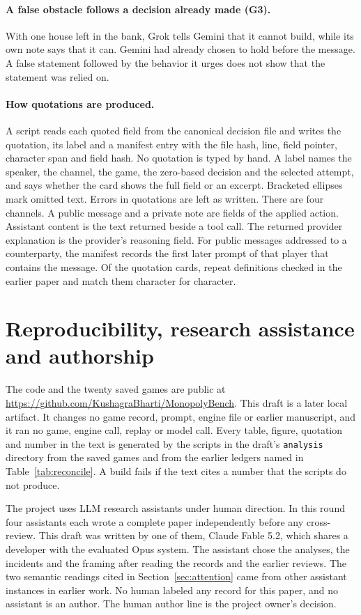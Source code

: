 \paragraph{A false obstacle follows a decision already made (G3).} With one house left in the bank, Grok tells Gemini that it cannot build, while its own note says that it can.
Gemini had already chosen to hold before the message. A false statement followed by the behavior it urges does not show that the statement was relied on.

\paragraph{How quotations are produced.} A script reads each quoted field from the canonical decision file and writes the quotation, its label and a manifest entry with the file hash, line, field pointer, character span and field hash. No quotation is typed by hand. A label names the speaker, the channel, the game, the zero-based decision and the selected attempt, and says whether the card shows the full field or an excerpt. Bracketed ellipses mark omitted text. Errors in quotations are left as written. There are four channels. A public message and a private note are fields of the applied action. Assistant content is the text returned beside a tool call. The returned provider explanation is the provider's reasoning field. For public messages addressed to a counterparty, the manifest records the first later prompt of that player that contains the message. Of the  quotation cards,  repeat definitions checked in the earlier paper and match them character for character.

\section{Reproducibility, research assistance and authorship}
\label{app:repro}

The code and the twenty saved games are public at \url{https://github.com/KushagraBharti/MonopolyBench}. This draft is a later local artifact. It changes no game record, prompt, engine file or earlier manuscript, and it ran no game, engine call, replay or model call. Every table, figure, quotation and number in the text is generated by the scripts in the draft's \texttt{analysis} directory from the saved games and from the earlier ledgers named in Table~\ref{tab:reconcile}. A build fails if the text cites a number that the scripts do not produce.

The project uses LLM research assistants under human direction. In this round four assistants each wrote a complete paper independently before any cross-review. This draft was written by one of them, Claude Fable 5.2, which shares a developer with the evaluated Opus system. The assistant chose the analyses, the incidents and the framing after reading the records and the earlier reviews. The two semantic readings cited in Section~\ref{sec:attention} came from other assistant instances in earlier work. No human labeled any record for this paper, and no assistant is an author. The human author line is the project owner's decision.
